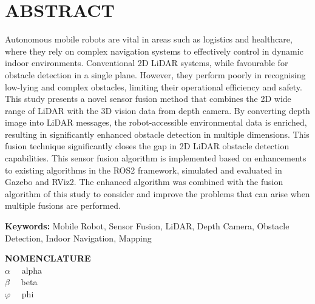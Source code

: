 \section*{ABSTRACT}
\vspace{0.5cm}
Autonomous mobile robots are vital in areas such as logistics and healthcare, where they rely on complex navigation systems to effectively control in dynamic indoor environments. Conventional 2D LiDAR systems, while favourable for obstacle detection in a single plane. However, they perform poorly in recognising low-lying and complex obstacles, limiting their operational efficiency and safety.
This study presents a novel sensor fusion method that combines the 2D wide range of LiDAR with the 3D vision data from depth camera. By converting depth image into LiDAR messages, the robot-accessible environmental data is enriched, resulting in significantly enhanced obstacle detection in multiple dimensions. This fusion technique significantly closes the gap in 2D LiDAR obstacle detection capabilities.
This sensor fusion algorithm is implemented based on enhancements to existing algorithms in the ROS2 framework, simulated and evaluated in Gazebo and RViz2. The enhanced algorithm was combined with the fusion algorithm of this study to consider and improve the problems that can arise when multiple fusions are performed.
\vspace{0.5cm}

\textbf{Keywords:} Mobile Robot, Sensor Fusion, LiDAR, Depth Camera, Obstacle Detection, Indoor Navigation, Mapping

\vspace{0.5cm}
\textbf{NOMENCLATURE}
\\
$\alpha \quad$ alpha
\\
$\beta \quad$ beta
\\
$\varphi \quad$ phi